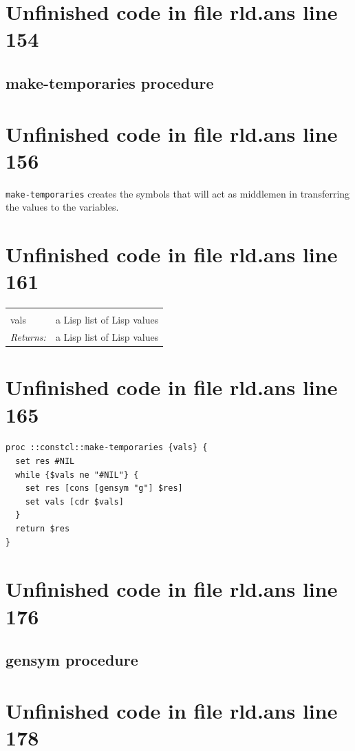 \documentclass[twoside,9pt]{report}
\begin{document}
\section{Unfinished code in file rld.ans line 154}
\subsection{make-temporaries procedure}
\label{make-temporaries-procedure}
\section{Unfinished code in file rld.ans line 156}


\texttt{make-temporaries} creates the symbols that will act as middlemen in transferring the values to the variables.

\section{Unfinished code in file rld.ans line 161}
\noindent\begin{tabular}{ |p{1.9cm} p{8cm}| }
\hline
\rowcolor[HTML]{CCCCCC} \multicolumn{2}{|l|}{\bf make-temporaries (internal)} \\
vals & a Lisp list of Lisp values \\
\textit{Returns:} & a Lisp list of Lisp values \\
\hline
\end{tabular}
\section{Unfinished code in file rld.ans line 165}
\begin{lstlisting}
proc ::constcl::make-temporaries {vals} {
  set res #NIL
  while {$vals ne "#NIL"} {
    set res [cons [gensym "g"] $res]
    set vals [cdr $vals]
  }
  return $res
}
\end{lstlisting}
\section{Unfinished code in file rld.ans line 176}
\subsection{gensym procedure}
\label{gensym-procedure}
\section{Unfinished code in file rld.ans line 178}
\end{document}
